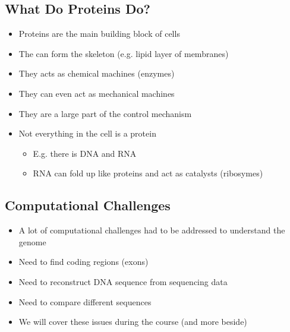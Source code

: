 \begin{slide}
\section{What Do Proteins Do?}

\begin{PauseHighLight}
  \begin{itemize}
  \item Proteins are the main building block of cells\pause
  \item The can form the skeleton (e.g. lipid layer of membranes)\pause
  \item They acts as chemical machines (enzymes)\pause
  \item They can even act as mechanical machines\pause
  \item They are a large part of the control mechanism\pause
  \item Not everything in the cell is a protein
    \begin{itemize}
      \item E.g. there is DNA and RNA\pause
      \item RNA can fold up like proteins and act as catalysts
        (ribosymes)\pause
    \end{itemize}
  \end{itemize}
\end{PauseHighLight}

\end{slide}


\begin{slide}
\section{Computational Challenges}

\begin{PauseHighLight}
  \begin{itemize}
  \item A lot of computational challenges had to be addressed to
    understand the genome\pause
  \item Need to find coding regions (exons)\pause
  \item Need to reconstruct DNA sequence from sequencing data\pause
  \item Need to compare different sequences\pause
  \item We will cover these issues during the course\pause{} (and more
    beside)\pauseb
  \end{itemize}
\end{PauseHighLight}

\end{slide}

